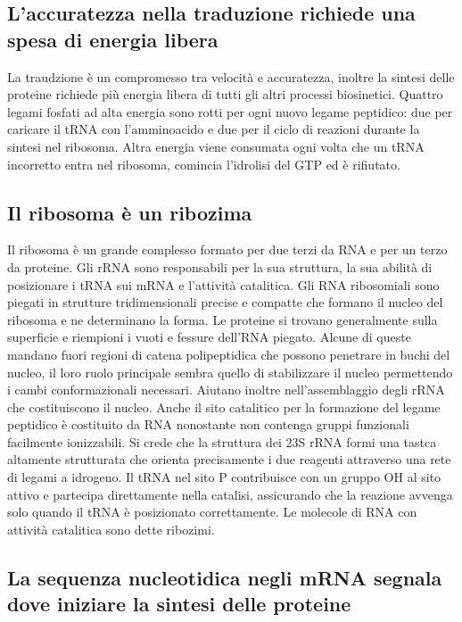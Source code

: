 \subsection{L'accuratezza nella traduzione richiede una spesa di energia libera}
La traudzione \`e un compromesso tra velocit\`a e accuratezza, inoltre la sintesi delle proteine richiede pi\`u energia libera di tutti gli altri processi biosinetici. Quattro legami
fosfati ad alta energia sono rotti per ogni nuovo legame peptidico: due per caricare il tRNA con l'amminoacido e due per il ciclo di reazioni durante la sintesi nel ribosoma. Altra
energia viene consumata ogni volta che un tRNA incorretto entra nel ribosoma, comincia l'idrolisi del GTP ed \`e rifiutato. 
\subsection{Il ribosoma \`e un ribozima}
Il ribosoma \`e un grande complesso formato per due terzi da RNA e per un terzo da proteine. Gli rRNA sono responsabili per la sua struttura, la sua abilit\`a di posizionare i tRNA sui 
mRNA e l'attivit\`a catalitica. Gli RNA ribosomiali sono piegati in strutture tridimensionali precise e compatte che formano il nucleo del ribosoma e ne determinano la forma. Le proteine
si trovano generalmente sulla superficie e riempioni i vuoti e fessure dell'RNA piegato. Alcune di queste mandano fuori regioni di catena polipeptidica che possono penetrare in buchi 
del nucleo, il loro ruolo principale sembra quello di stabilizzare il nucleo permettendo i cambi conformazionali necessari. Aiutano inoltre nell'assemblaggio degli rRNA che costituiscono
il nucleo. Anche il sito catalitico per la formazione del legame peptidico \`e costituito da RNA nonostante non contenga gruppi funzionali facilmente ionizzabili. Si crede che la 
struttura dei 23S rRNA formi una tastca altamente strutturata che orienta precisamente i due reagenti attraverso una rete di legami a idrogeno. Il tRNA nel sito P contribuisce con un
gruppo OH al sito attivo e partecipa direttamente nella catalisi, assicurando che la reazione avvenga solo quando il tRNA \`e posizionato correttamente. Le molecole di RNA con attivit\`a
catalitica sono dette ribozimi. 
\subsection{La sequenza nucleotidica negli mRNA segnala dove iniziare la sintesi delle proteine}
